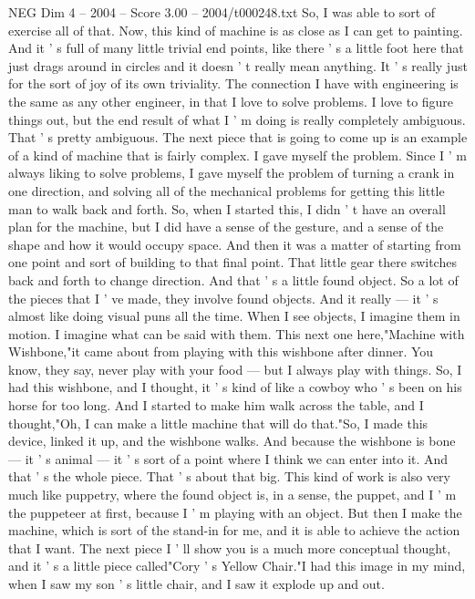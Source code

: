 \begin{textsample}{NEG Dim 4 – 2004 – Score 3.00 – 2004/t000248.txt}
So, I was able to sort of exercise all of that.
Now, this kind of machine is as close as I can get to painting.
And it ' s full of many little trivial end points, like there ' s a little foot here that just drags around in circles and it doesn ' t really mean anything.
It ' s really just for the sort of joy of its own triviality.
The connection I have with engineering is the same as any other engineer, in that I love to solve problems.
I love to figure things out, but the end result of what I ' m doing is really completely ambiguous.
That ' s pretty ambiguous.
The next piece that is going to come up is an example of a kind of machine that is fairly complex.
I gave myself the problem.
Since I ' m always liking to solve problems, I gave myself the problem of turning a crank in one direction, and solving all of the mechanical problems for getting this little man to walk back and forth.
So, when I started this, I didn ' t have an overall plan for the machine, but I did have a sense of the gesture, and a sense of the shape and how it would occupy space.
And then it was a matter of starting from one point and sort of building to that final point.
That little gear there switches back and forth to change direction.
And that ' s a little found object.
So a lot of the pieces that I ' ve made, they involve found objects.
And it really — it ' s almost like doing visual puns all the time.
When I see objects, I imagine them in motion.
I imagine what can be said with them.
This next one here,"Machine with Wishbone,"it came about from playing with this wishbone after dinner.
You know, they say, never play with your food — but I always play with things.
So, I had this wishbone, and I thought, it ' s kind of like a cowboy who ' s been on his horse for too long.
And I started to make him walk across the table, and I thought,"Oh, I can make a little machine that will do that."So, I made this device, linked it up, and the wishbone walks.
And because the wishbone is bone — it ' s animal — it ' s sort of a point where I think we can enter into it.
And that ' s the whole piece.
That ' s about that big.
This kind of work is also very much like puppetry, where the found object is, in a sense, the puppet, and I ' m the puppeteer at first, because I ' m playing with an object.
But then I make the machine, which is sort of the stand-in for me, and it is able to achieve the action that I want.
The next piece I ' ll show you is a much more conceptual thought, and it ' s a little piece called"Cory ' s Yellow Chair."I had this image in my mind, when I saw my son ' s little chair, and I saw it explode up and out.

\end{textsample}
